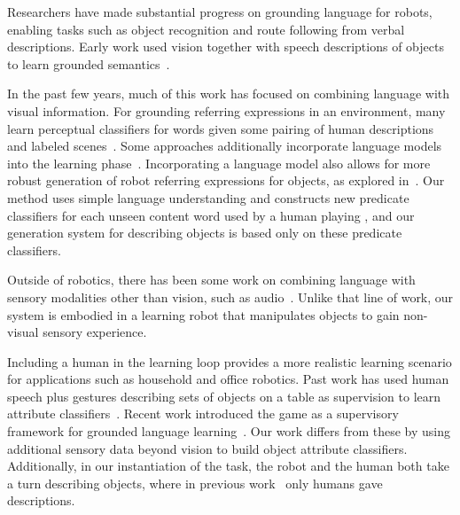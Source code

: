 Researchers have made substantial progress on grounding language for robots, enabling tasks such as object recognition and route following from verbal descriptions.
Early work used vision together with speech descriptions of objects to learn grounded semantics~\cite{roy:cogsci02}.

In the past few years, much of this work has focused on combining language with visual information.
For grounding referring expressions in an environment, many learn perceptual classifiers for words given some pairing of human descriptions and labeled scenes~\cite{liu:acl14,malinowski:nips14,mohan:acs13,sun:icra13,dindo:iros10,vogel:aaai10}.
Some approaches additionally incorporate language models into the learning phase~\cite{spranger:ijcai15,krishnamurthy:acl13,perera:aaai13,matuszek:icml12}.
Incorporating a language model also allows for more robust generation of robot referring expressions for objects, as explored in~\cite{tellex:rss14}. Our method uses simple language understanding and constructs new predicate classifiers for each unseen content word used by a human playing \ispy, and our generation system for describing objects is based only on these predicate classifiers.

Outside of robotics, there has been some work on combining language with sensory modalities other than vision, such as audio~\cite{kiela:emnlp15}.
Unlike that line of work, our system is embodied in a learning robot that manipulates objects to gain non-visual sensory experience.

Including a human in the learning loop provides a more realistic learning scenario for applications such as household and office robotics.
Past work has used human speech plus gestures describing sets of objects on a table as supervision to learn attribute classifiers~\cite{matuszek:aaai14,kollar:rss13}. Recent work introduced the \ispy game as a supervisory framework for grounded language learning~\cite{parde:ijcai15}.
Our work differs from these by using additional sensory data beyond vision to build object attribute classifiers. Additionally, in our instantiation of the \ispy task, the robot and the human both take a turn describing objects, where in previous work~\cite{parde:ijcai15} only humans gave descriptions.
